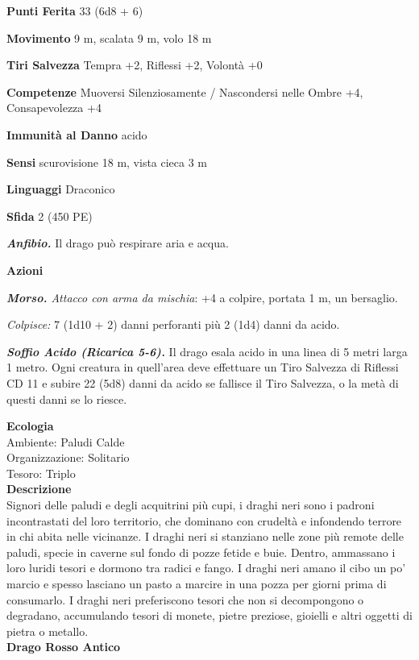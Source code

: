\begin{multicols}{2}
\textbf{Punti Ferita} 33 (6d8 + 6)

\textbf{Movimento} 9 m, scalata 9 m, volo 18 m

\textbf{Tiri Salvezza} Tempra +2, Riflessi +2, Volontà +0

\textbf{Competenze} Muoversi Silenziosamente / Nascondersi nelle Ombre +4, Consapevolezza +4

\textbf{Immunità al Danno} acido

\textbf{Sensi} scurovisione 18 m, vista cieca 3 m

\textbf{Linguaggi} Draconico

\textbf{Sfida} 2 (450 PE)

\emph{\textbf{Anfibio.}} Il drago può respirare aria e acqua.

\textbf{Azioni}

\emph{\textbf{Morso.} Attacco con arma da mischia}: +4 a colpire, portata 1 m, un bersaglio.

\emph{Colpisce:} 7 (1d10 + 2) danni perforanti più 2 (1d4) danni da acido.

\emph{\textbf{Soffio Acido (Ricarica 5-6).}} Il drago esala acido in una linea di 5 metri larga 1 metro. Ogni creatura in quell'area deve effettuare un Tiro Salvezza di Riflessi CD 11 e subire 22 (5d8) danni da acido se fallisce il Tiro Salvezza, o la metà di questi danni se lo riesce.

\textbf{Ecologia}\\
Ambiente: Paludi Calde\\
Organizzazione: Solitario\\
Tesoro: Triplo\\
\textbf{Descrizione}\\
Signori delle paludi e degli acquitrini più cupi, i draghi neri sono i padroni incontrastati del loro territorio, che dominano con crudeltà e infondendo terrore in chi abita nelle vicinanze. I draghi neri si stanziano nelle zone più remote delle paludi, specie in caverne sul fondo di pozze fetide e buie. Dentro, ammassano i loro luridi tesori e dormono tra radici e fango. I draghi neri amano il cibo un po' marcio e spesso lasciano un pasto a marcire in una pozza per giorni prima di consumarlo. I draghi neri preferiscono tesori che non si decompongono o degradano, accumulando tesori di monete, pietre preziose, gioielli e altri oggetti di pietra o metallo.\\


\medskip{}\textbf{Drago Rosso Antico}


\end{multicols}
